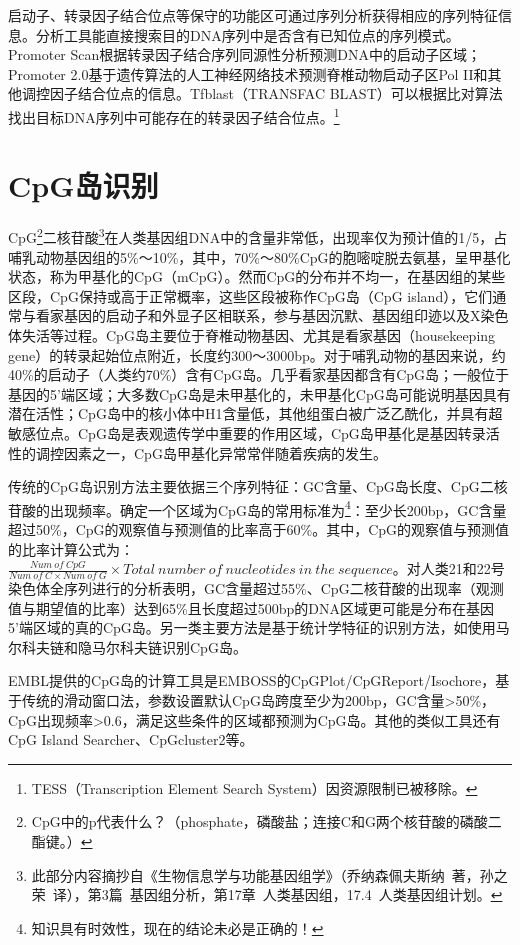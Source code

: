 \documentclass[11pt,a4paper,twoside]{book}
\begin{document}
启动子、转录因子结合位点等保守的功能区可通过序列分析获得相应的序列特征信息。分析工具能直接搜索目的DNA序列中是否含有已知位点的序列模式。Promoter Scan根据转录因子结合序列同源性分析预测DNA中的启动子区域；Promoter 2.0基于遗传算法的人工神经网络技术预测脊椎动物启动子区Pol II和其他调控因子结合位点的信息。Tfblast（TRANSFAC BLAST）可以根据比对算法找出目标DNA序列中可能存在的转录因子结合位点。\footnote{TESS（Transcription Element Search System）因资源限制已被移除。}

\section{CpG岛识别}
CpG\footnote{CpG中的p代表什么？（phosphate，磷酸盐；连接C和G两个核苷酸的磷酸二酯键。）}二核苷酸\footnote{此部分内容摘抄自《生物信息学与功能基因组学》（乔纳森\textbullet 佩夫斯纳\ 著，孙之荣\ 译），第3篇\ 基因组分析，第17章\ 人类基因组，17.4\ 人类基因组计划。}在人类基因组DNA中的含量非常低，出现率仅为预计值的1/5，占哺乳动物基因组的5\%～10\%，其中，70\%～80\%CpG的胞嘧啶脱去氨基，呈甲基化状态，称为甲基化的CpG（mCpG）。然而CpG的分布并不均一，在基因组的某些区段，CpG保持或高于正常概率，这些区段被称作CpG岛（CpG island），它们通常与看家基因的启动子和外显子区相联系，参与基因沉默、基因组印迹以及X染色体失活等过程。CpG岛主要位于脊椎动物基因、尤其是看家基因（housekeeping gene）的转录起始位点附近，长度约300～3000bp。对于哺乳动物的基因来说，约40\%的启动子（人类约70\%）含有CpG岛。几乎看家基因都含有CpG岛；一般位于基因的5'端区域；大多数CpG岛是未甲基化的，未甲基化CpG岛可能说明基因具有潜在活性；CpG岛中的核小体中H1含量低，其他组蛋白被广泛乙酰化，并具有超敏感位点。CpG岛是表观遗传学中重要的作用区域，CpG岛甲基化是基因转录活性的调控因素之一，CpG岛甲基化异常常伴随着疾病的发生。

传统的CpG岛识别方法主要依据三个序列特征：GC含量、CpG岛长度、CpG二核苷酸的出现频率。确定一个区域为CpG岛的常用标准为\footnote{知识具有时效性，现在的结论未必是正确的！}：至少长200bp，GC含量超过50\%，CpG的观察值与预测值的比率高于60\%。其中，CpG的观察值与预测值的比率计算公式为：$\frac{Num\ of\ CpG}{Num\ of\ C \times Num\ of\ G} \times Total\ number\ of\ nucleotides\ in\ the\ sequence$。对人类21和22号染色体全序列进行的分析表明，GC含量超过55\%、CpG二核苷酸的出现率（观测值与期望值的比率）达到65\%且长度超过500bp的DNA区域更可能是分布在基因5'端区域的真的CpG岛。另一类主要方法是基于统计学特征的识别方法，如使用马尔科夫链和隐马尔科夫链识别CpG岛。

EMBL提供的CpG岛的计算工具是EMBOSS的CpGPlot/CpGReport/Isochore，基于传统的滑动窗口法，参数设置默认CpG岛跨度至少为200bp，GC含量\textgreater 50\%，CpG出现频率\textgreater 0.6，满足这些条件的区域都预测为CpG岛。其他的类似工具还有CpG Island Searcher、CpGcluster2等。
\end{document}
